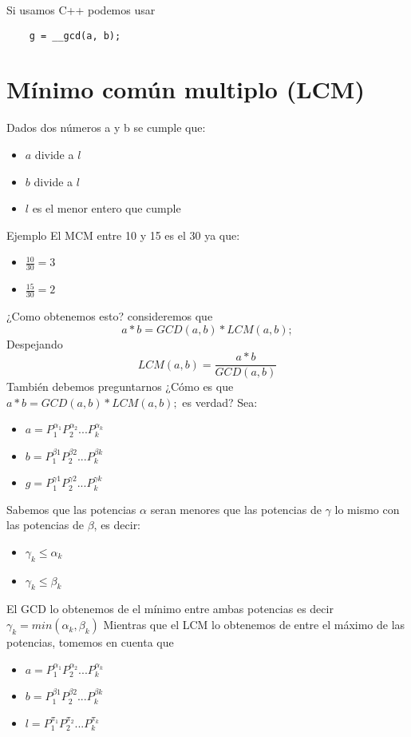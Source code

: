 Si usamos C++ podemos usar 

\begin{lstlisting}
    g = __gcd(a, b);
\end{lstlisting}

\section{Mínimo común multiplo (LCM)}
Dados dos números a y b se cumple que:
\begin{itemize}
    \item {$a$ divide a $l$}
    \item {$b$ divide a $l$}
    \item {$l$ es el menor entero que cumple}
\end{itemize}
\textsf{Ejemplo}\newline
El MCM entre 10 y 15 es el 30 ya que:
\begin{itemize}
    \item {$\frac{10}{30} = 3$}
    \item {$\frac{15}{30} = 2$}
\end{itemize}
¿Como obtenemos esto? consideremos que 
\[
    a * b = GCD(a, b) * LCM(a, b);
\]
Despejando 
\[
    LCM(a, b) = \frac{a * b}{GCD(a, b)}
\]
También debemos preguntarnos ¿Cómo es que $a * b = GCD(a, b) * LCM(a, b);$ es verdad? \newline
Sea:
\begin{itemize}
    \item {$a = P_{1}^{\alpha_{1}}P_{2}^{\alpha_{2}}...P_{k}^{\alpha_{k}}$}
    \item {$b = P_{1}^{\beta{1}}P_{2}^{\beta{2}}...P_{k}^{\beta{k}}$}
    \item {$g = P_{1}^{\gamma{1}}P_{2}^{\gamma{2}}...P_{k}^{\gamma{k}}$}
\end{itemize}
Sabemos que las potencias $\alpha$ seran menores que las potencias de $\gamma$ lo mismo con las potencias de $\beta$, es decir:
\begin{itemize}
    \item {$\gamma_{k} \leq \alpha_{k}$}
    \item {$\gamma_{k} \leq \beta_{k}$}
\end{itemize}
El GCD lo obtenemos de el mínimo entre ambas potencias es decir \newline
$\gamma_{k} = min(\alpha_{k}, \beta_{k})$ \newline
Mientras que el LCM lo obtenemos de entre el máximo de las potencias, tomemos en cuenta que 
\begin{itemize}
    \item {$a = P_{1}^{\alpha_{1}}P_{2}^{\alpha_{2}}...P_{k}^{\alpha_{k}}$}
    \item {$b = P_{1}^{\beta{1}}P_{2}^{\beta{2}}...P_{k}^{\beta{k}}$}
    \item {$l = P_{1}^{\pi_{1}}P_{2}^{\pi_{2}}...P_{k}^{\pi_{k}}$}
\end{itemize}
